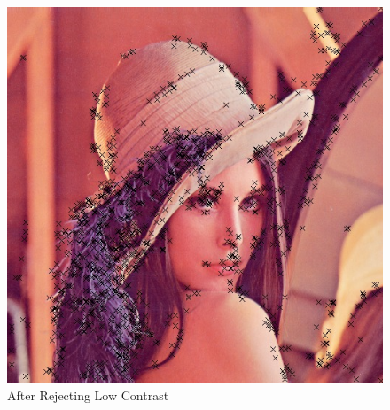 \begin{enumerate}
\begin{figure}[H]
\begin{minipage}[b]{0.46\linewidth}
        \includegraphics[scale=0.4]{res/feature_after_contrast.png}
        \caption{After Rejecting Low Contrast\label{fig:feature2}}
      \end{minipage}


\end{figure}
\end{enumerate}
